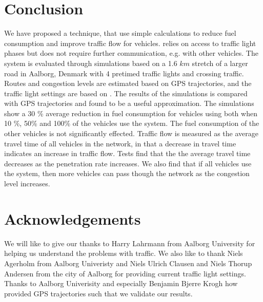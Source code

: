 \section{Conclusion}\label{sec:Conclusion}
We have proposed a technique, \tech that use simple calculations to reduce fuel consumption and improve traffic flow for vehicles.
\tech relies on access to traffic light phases but does not require further communication, e.g. with other vehicles.
The system is evaluated through simulations based on a 1.6 $km$ stretch of a larger road in Aalborg, Denmark with 4 pretimed traffic lights and crossing traffic.
Routes and congestion levels are estimated based on GPS trajectories, and the traffic light settings are based on \cite{vejtrafik}.
The results of the simulations is compared with GPS trajectories and found to be a useful approximation.
The simulations show a 30 \% average reduction in fuel consumption for vehicles using \tech both when 10 \%, 50\% and 100\% of the vehicles use the system.
The fuel consumption of the other vehicles is not significantly effected.
Traffic flow is measured as the average travel time of all vehicles in the network, in that a decrease in travel time indicates an increase in traffic flow.
Tests find that the the average travel time decreases as the penetration rate increases. 
We also find that if all vehicles use the system, then more vehicles can pass though the network as the congestion level increases.

\section*{Acknowledgements}
We will like to give our thanks to Harry Lahrmann from Aalborg University for helping us understand the problems with traffic.
We also like to thank Niels Agerholm from Aalborg Univeristy and Niels Ulrich Clausen and Niels Thorup Andersen from the city of Aalborg for providing current traffic light settings.
Thanks to Aalborg Univerisity and especially Benjamin Bjerre Krogh how provided GPS trajectories such that we validate our results.


